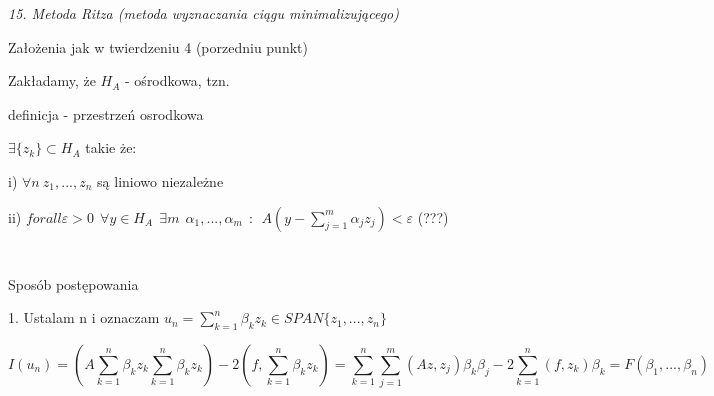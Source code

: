 \textit{15. Metoda Ritza (metoda wyznaczania ciągu minimalizującego)}

Założenia jak w twierdzeniu 4 (porzedniu punkt)

Zakładamy, że $H_A$ - ośrodkowa, tzn.

definicja - przestrzeń osrodkowa

$\exists \{z_k\} \subset H_A$ takie że:

i) $\forall n\ z_1, ..., z_n$ są liniowo niezależne

ii) $forall \varepsilon > 0\ \ \forall y \in H_A \ \ \exists m\ \ \alpha _1, ..., \alpha _m\ \ : \ \ A(y - \sum_{j=1}^{m} \alpha _j z_j) < \varepsilon$ (???)

$\ $

$\ $

Sposób postępowania

1. Ustalam n i oznaczam $u_n = \sum_{k=1}^{n} \beta _k z_k \in SPAN\{z_1, ..., z_n\}$

\[ I(u_n) = (A\sum_{k=1}^{n} \beta _k z_k \sum_{k=1}^{n} \beta _k z_k) - 2(f, \sum_{k=1}^{n} \beta _k z_k) = \sum_{k=1}^{n}\sum_{j=1}^{m} (Az,z_j) \beta _k \beta _j - 2\sum_{k=1}^{n} (f, z_k) \beta _k = F(\beta _1, ..., \beta _n)\]